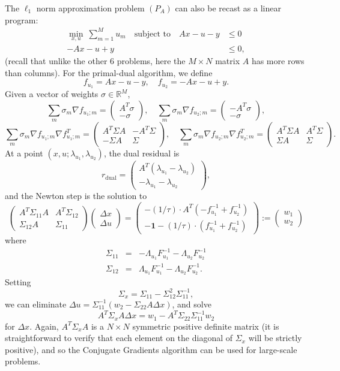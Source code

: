\documentclass{article}
\newcommand{\bpm}{\left(\begin{matrix}}
\newcommand{\epm}{\end{matrix}\right)}
\newcommand{\grad}{\nabla}
\newcommand{\dx}{\Delta x}
\newcommand{\du}{\Delta u}
\newcommand{\R}{\mathbb{R}}
\newcommand{\<}{\langle}
\renewcommand{\>}{\rangle}
\begin{document}
The $\ell_1$ norm approximation problem $(P_A)$ can also be recast as a linear program:
\begin{align*}
\min_{x,u}~\sum_{m=1}^M u_m \quad\text{subject~to}\quad
 Ax - u -y & \leq 0 \\[-4mm]
 -Ax - u + y & \leq 0,
\end{align*}
(recall that unlike the other 6 problems, here the $M\times N$ matrix $A$ has more rows than columns).
For the primal-dual algorithm, we define
\[
f_{u_1} = A x - u - y,\quad
f_{u_2} = -A x - u + y.
\]
Given a vector of weights $\sigma\in\R^M$,
\[
\sum_m \sigma_m\grad f_{u_1;m} = 
\bpm A^T\sigma \\ -\sigma \epm, \quad
\sum_m \sigma_m\grad f_{u_2;m} = 
\bpm -A^T\sigma \\ -\sigma \epm,
\]
\[
\sum_m \sigma_m\grad f_{u_1;m}\grad f_{u_1;m}^T = 
\bpm A^T\Sigma A & -A^T\Sigma \\ -\Sigma A & \Sigma \epm,\quad
\sum_m \sigma_m\grad f_{u_2;m}\grad f_{u_2;m}^T = 
\bpm A^T\Sigma A & A^T\Sigma \\ \Sigma A & \Sigma \epm.
\]
At a point $(x,u;\lambda_{u_1},\lambda_{u_2})$, the dual residual is
\[
r_{\mathrm{dual}} = 
\bpm A^T(\lambda_{u_1}-\lambda_{u_2}) \\ -\lambda_{u_1}-\lambda_{u_2} \epm, 
\]
and the Newton step is the solution to
\[
\bpm A^T\Sigma_{11}A & A^T\Sigma_{12} \\ \Sigma_{12}A &  \Sigma_{11}\epm 
\bpm \dx \\ \du \epm = 
\bpm -(1/\tau)\cdot A^T(-f^{-1}_{u_1} + f^{-1}_{u_2}) \\ 
-\mathbf{1} - (1/\tau)\cdot(f^{-1}_{u_1} + f^{-1}_{u_2}) \epm :=
\bpm w_1 \\ w_2 \epm
\]
where
\begin{eqnarray*}
\Sigma_{11} & = & -\Lambda_{u_1} F^{-1}_{u_1} - \Lambda_{u_2} F^{-1}_{u_2} \\
\Sigma_{12} & = & \Lambda_{u_1} F^{-1}_{u_1} - \Lambda_{u_2} F^{-1}_{u_2}.
\end{eqnarray*}
Setting
\[
\Sigma_x = \Sigma_{11} - \Sigma^2_{12}\Sigma^{-1}_{11},
\]
we can eliminate $\du = \Sigma_{11}^{-1}(w_2 - \Sigma_{22}A\dx)$, and solve
\[
A^T\Sigma_x A\dx = w_1 - A^T\Sigma_{22}\Sigma^{-1}_{11}w_2
\]
for $\dx$.  Again, $A^T\Sigma_x A$ is a $N\times N$ symmetric positive definite matrix (it is straightforward to verify that each element on the diagonal of $\Sigma_x$ will be strictly positive), 
and so the Conjugate Gradients algorithm can be used for large-scale problems. 
\end{document}
